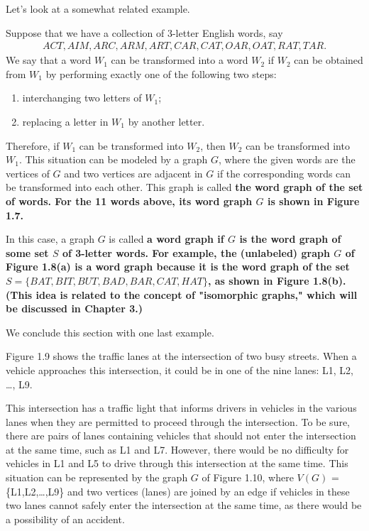

Let's look at a somewhat related example.

\begin{exmp}
Suppose that we have a collection of 3-letter English words, say
\begin{align*}
ACT, AIM, ARC, ARM, ART, CAR, CAT, OAR, OAT, RAT, TAR.
\end{align*}
We say that a word $W_{1}$ can be transformed into a word $W_{2}$ if $W_{2}$ can be obtained from $W_{1}$ by performing exactly one of the following two steps:
\begin{enumerate}[{(1)}]
\item interchanging two letters of $W_{1}$;
\item replacing a letter in $W_{1}$ by another letter.
\end{enumerate}
Therefore, if $W_{1}$ can be transformed into $W_{2}$, then $W_{2}$ can be transformed into $W_{1}$. This situation can be modeled by a graph $G$, where the given words are the vertices of $G$ and two vertices are adjacent in $G$ if the corresponding words can be transformed into each other. This graph is called \bf{the word graph of the set of words}. For the 11 words above, its word graph $G$ is shown in Figure 1.7.



In this case, a graph $G$ is called \bf{a word graph} if $G$ is the word graph of some set $S$ of 3-letter words. For example, the (unlabeled) graph $G$ of Figure 1.8(a) is a word graph because it is the word graph of the set $S = \{BAT, BIT, BUT, BAD, BAR, CAT, HAT\}$, as shown in Figure 1.8(b). (This idea is related to the concept of "isomorphic graphs," which will be discussed in Chapter 3.)
\end{exmp}



We conclude this section with one last example.

\begin{exmp}
Figure 1.9 shows the traffic lanes at the intersection of two busy streets. When a vehicle approaches this intersection, it could be in one of the nine lanes: L1, L2, \ldots, L9.



This intersection has a traffic light that informs drivers in vehicles in the various lanes when they are permitted to proceed through the intersection. To be sure, there are pairs of lanes containing vehicles that should not enter the intersection at the same time, such as L1 and L7. However, there would be no difficulty for vehicles in L1 and L5 to drive through this intersection at the same time. This situation can be represented by the graph $G$ of Figure 1.10, where $V(G)$ = \{L1,L2,\ldots,L9\} and two vertices (lanes) are joined by an edge if vehicles in these two lanes cannot safely enter the intersection at the same time, as there would be a possibility of an accident.
\end{exmp}

